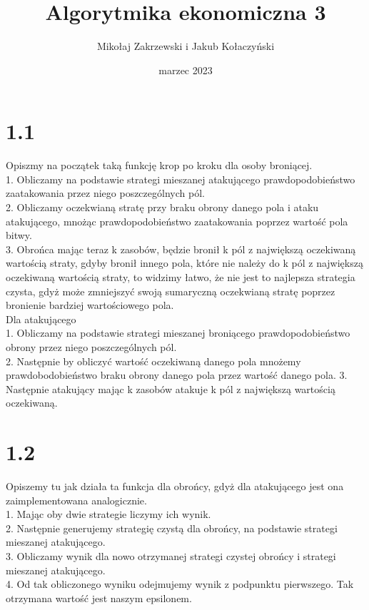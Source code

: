 \documentclass{article}
\title{Algorytmika ekonomiczna 3}
\author{Mikołaj Zakrzewski i Jakub Kołaczyński}
\date{marzec 2023}
\begin{document}
\maketitle
\section*{1.1}
    Opiszmy na początek taką funkcję krop po kroku dla osoby broniącej.\\
    1. Obliczamy na podstawie strategi mieszanej atakującego prawdopodobieństwo zaatakowania przez niego poszczególnych pól.\\
    2. Obliczamy oczekwianą stratę przy braku obrony danego pola i ataku atakującego, mnożąc prawdopodobieństwo zaatakowania poprzez wartość pola bitwy.\\
    3. Obrońca mając teraz k zasobów, będzie bronił k pól z największą oczekiwaną wartością straty, gdyby bronił innego pola, które nie należy do k pól z największą oczekiwaną wartością straty, to widzimy łatwo, że nie jest to najlepsza strategia czysta, gdyż może zmniejszyć swoją sumaryczną oczekwianą stratę poprzez bronienie bardziej wartościowego pola.
    \\
    Dla atakującego \\
    1. Obliczamy na podstawie strategi mieszanej broniącego prawdopodobieństwo obrony przez niego poszczególnych pól.\\
    2. Następnie by obliczyć wartość oczekiwaną danego pola mnożemy prawdobodobieństwo braku obrony danego pola przez wartość danego pola.
    3. Następnie atakujący mając k zasobów atakuje k pól z największą wartością oczekiwaną.\\
\section*{1.2}

\begin{flushleft}
Opiszemy tu jak działa ta funkcja dla obrońcy, gdyż dla atakującego jest ona zaimplementowana analogicznie.\\
    1. Mając oby dwie strategie liczymy ich wynik.\\
    2. Następnie generujemy strategię czystą dla obrońcy, na podstawie strategi mieszanej atakującego.\\
    3. Obliczamy wynik dla nowo otrzymanej strategi czystej obrońcy i strategi mieszanej atakującego.\\
    4. Od tak obliczonego wyniku odejmujemy wynik z podpunktu pierwszego. Tak otrzymana wartość jest naszym epsilonem.
\end{flushleft}
\end{document}
